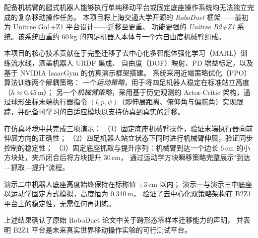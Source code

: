 
配备机械臂的腿式机器人能够执行单纯移动平台或固定底座操作系统均无法独立完成的复杂移动操作任务。
本项目将上海交通大学开源的 \textit{RoboDuet} 框架——最初为 Unitree Go1+Z1 平台设计——迁移至更重、
功能更强的 \textit{Unitree B2+Z1} 系统。该系统由重约 60\,kg 的四足机器人本体与一个六自由度机械臂组成。

本项目的核心技术贡献在于完整迁移了去中心化多智能体强化学习（MARL）训练流水线，涵盖机器人 URDF 集成、
自由度（DOF）映射、PD 增益标定，以及基于 NVIDIA IsaacGym 的仿真演示框架搭建。
系统采用近端策略优化（PPO）算法训练两个解耦策略：
一个\textit{运动策略}，用于将四足机器人稳定在标准站立高度（$h\approx0.45$\,m）；
另一个\textit{机械臂策略}，采用基于历史观测的 Actor-Critic 架构，通过球形坐标末端执行器指令
$(l, p, \psi)$（即伸展距离、俯仰角与偏航角）实现跟踪，并配备可学习的自适应模块以支持仿真到真实的迁移。

在仿真环境中共完成三项演示：
（1）固定底座机械臂操作，验证末端执行器向前伸展方向的正确性；
（2）四足机器人站立状态下同时进行机械臂伸展，验证同步控制的稳定性；
（3）固定底座抓取与提升序列：机械臂到达一个边长 6\,cm 的小方块处，夹爪闭合后将方块提升 30\,cm，
通过运动学方块瞬移策略完整展示"到达—抓取—提升"流程。

演示二中机器人底座高度始终保持在标称值 $\pm$3\,cm 以内；
演示一与演示三中底座以运动学固定方式模拟，高度恒为 0.340\,m，
验证了去中心化双策略架构在 B2Z1 平台上的稳定性，无需任何再训练。

上述结果确认了原始 RoboDuet 论文中关于跨形态零样本迁移能力的声明，
并表明 B2Z1 平台是未来真实世界移动操作实验的可行测试平台。
